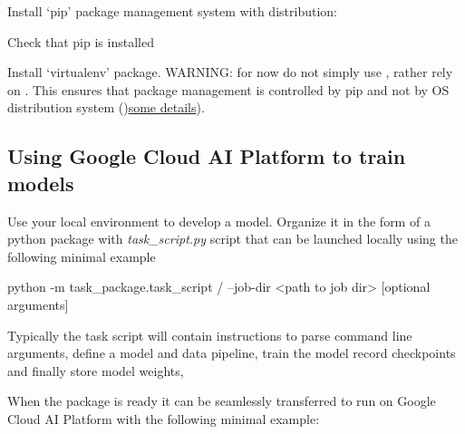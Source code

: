 \documentclass[12pt]{article}
\begin{document}
Install `pip' package management system with distribution:

Check that pip is installed

Install `virtualenv' package. WARNING: for now do not simply use , rather rely on . This ensures that package management is controlled by pip and not by OS distribution system ()\href{https://github.com/pypa/pip/issues/5599}{some details}).

\subsection{Using Google Cloud AI Platform to train models}
Use your local environment to develop a model. Organize it in the form of a python package with \emph{task\_script.py} script that can be launched locally using the following minimal example

\begin{bash}
python -m task_package.task_script /
  --job-dir <path to job dir> [optional arguments]
\end{bash}

Typically the task script will contain instructions to parse command line arguments, define a model and data pipeline, train the model record checkpoints and finally store model weights,

When the package is ready it can be seamlessly transferred to run on Google Cloud AI Platform with the following minimal example:
\end{document}
